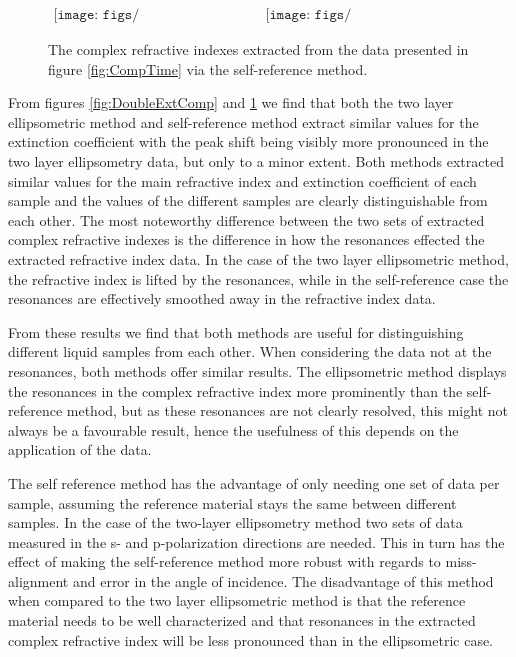 \begin{figure}[H]
                \begin{center}$
								\begin{array}{cc}
                \texttt{[image: figs/TwoLayerSelfMultiN.png]}&
                \texttt{[image: figs/TwoLayerSelfMultiK.png]}
								\end{array}$
								\end{center}
	\caption[Complex refractive index extracted from example of a single layer isotropic medium deposited on a bulk isotropic sample, via the self-reference method]{The complex refractive indexes extracted from the data presented in figure \ref{fig:CompTime} via the self-reference method.}
	\label{fig:DoubleExtSelfComp}
\end{figure}

From figures \ref{fig:DoubleExtComp} and \ref{fig:DoubleExtSelfComp} we find that both the two layer ellipsometric method and self-reference method extract similar values for the extinction coefficient with the peak shift being visibly more pronounced in the two layer ellipsometry data, but only to a minor extent. Both methods extracted similar values for the main refractive index and extinction coefficient of each sample and the values of the different samples are clearly distinguishable from each other. The most noteworthy difference between the two sets of extracted complex refractive indexes is the difference in how the resonances effected the extracted refractive index data. In the case of the two layer ellipsometric method, the refractive index is lifted by the resonances, while in the self-reference case the resonances are effectively smoothed away in the refractive index data.

From these results we find that both methods are useful for distinguishing different liquid samples from each other. When considering the data not at the resonances, both methods offer similar results. The ellipsometric method displays the resonances in the complex refractive index more prominently than the self-reference method, but as these resonances are not clearly resolved, this might not always be a favourable result, hence the usefulness of this depends on the application of the data.

The self reference method has the advantage of only needing one set of data per sample, assuming the reference material stays the same between different samples. In the case of the two-layer ellipsometry method two sets of data measured in the s- and p-polarization directions are needed. This in turn has the effect of making the self-reference method more robust with regards to miss-alignment and error in the angle of incidence. The disadvantage of this method when compared to the two layer ellipsometric method is that the reference material needs to be well characterized and that resonances in the extracted complex refractive index will be less pronounced than in the ellipsometric case.
\endinput
